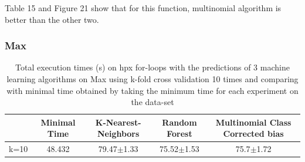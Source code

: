 Table 15 and Figure 21 show that for this function, multinomial algorithm is better than the other two. 
\newpage
\subsubsection{Max}
\begin{table}[h]
	\centering
	\caption{Total execution times (s) on hpx for-loops with the predictions of 3 machine learning algorithms on Max using k-fold cross validation 10 times and comparing with minimal time obtained by taking the minimum time for each experiment on the data-set}
	\label{my-label}
	\begin{tabular}{|c|c|c|c|c|}
		\hline
		& Minimal Time&K-Nearest-Neighbors & Random Forest &Multinomial Class Corrected bias\\ \hline
		k=10  &48.432&
		79.47$\pm$1.33       & 75.52$\pm$1.53&75.7$\pm$1.72 \\ \hline
	\end{tabular}
\end{table}

